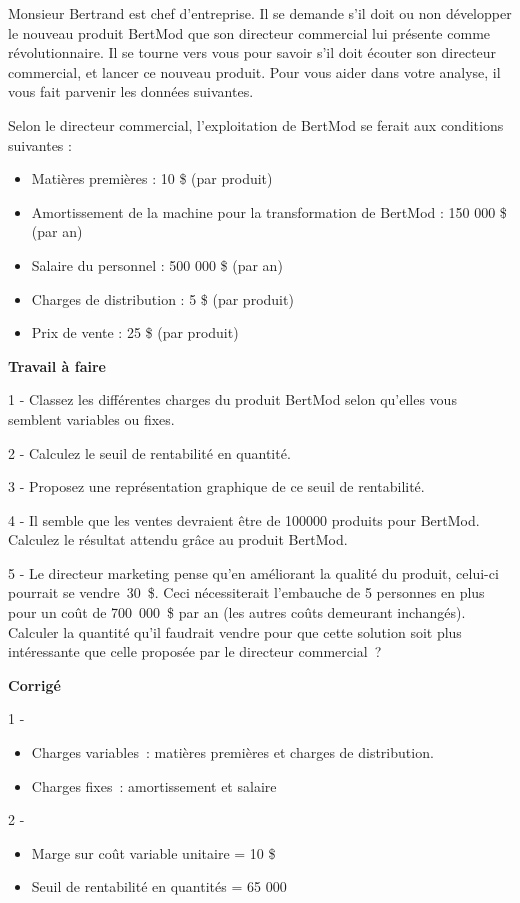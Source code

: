 \documentclass[oneside]{kaobook}
\begin{document}
Monsieur Bertrand est chef d'entreprise. Il se demande s'il doit ou non développer le nouveau produit BertMod que son directeur commercial lui présente comme révolutionnaire. Il se tourne vers vous pour savoir s'il doit écouter son directeur commercial, et lancer ce nouveau produit. Pour vous aider dans votre analyse, il vous fait parvenir les données suivantes.

Selon le directeur commercial, l'exploitation de BertMod se ferait aux conditions suivantes :
\begin{itemize}
\item Matières premières : 10 \$ (par produit)
\item Amortissement de la machine pour la transformation de BertMod : 150 000 \$ (par an)
\item Salaire du personnel : 500 000 \$ (par an)
\item Charges de distribution : 5 \$ (par produit)
\item Prix de vente : 25 \$ (par produit)
\end{itemize}

\textbf{Travail à faire}

1 - Classez les différentes charges du produit BertMod selon qu'elles vous semblent variables ou fixes.

2 - Calculez le seuil de rentabilité en quantité.

3 - Proposez une représentation graphique de ce seuil de rentabilité.

4 - Il semble que les ventes devraient être de 100000 produits pour BertMod. Calculez le résultat attendu grâce au produit BertMod.

5 - Le directeur marketing pense qu'en améliorant la qualité du produit, celui-ci pourrait se vendre 30 \$. Ceci nécessiterait l'embauche de 5 personnes en plus pour un coût de 700 000 \$ par an (les autres coûts demeurant inchangés). Calculer la quantité qu'il faudrait vendre pour que cette solution soit plus intéressante que celle proposée par le directeur commercial ?

\textbf{Corrigé}

1 - 
\begin{itemize}
\item Charges variables : matières premières et charges de distribution.
\item Charges fixes : amortissement et salaire
\end{itemize}

2 - 
\begin{itemize}
\item Marge sur coût variable unitaire = 10 \$
\item Seuil de rentabilité en quantités = 65 000
\end{itemize}
\end{document}
